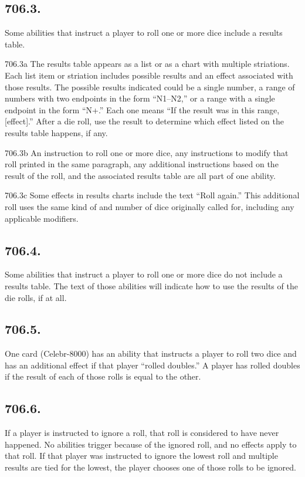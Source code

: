 \subsection*{706.3.}
Some abilities that instruct a player to roll one or more dice include a results table.

706.3a The results table appears as a list or as a chart with multiple striations. Each list item or striation includes possible results and an effect associated with those results. The possible results indicated could be a single number, a range of numbers with two endpoints in the form “N1–N2,” or a range with a single endpoint in the form “N+.” Each one means “If the result was in this range, [effect].” After a die roll, use the result to determine which effect listed on the results table happens, if any.

706.3b An instruction to roll one or more dice, any instructions to modify that roll printed in the same paragraph, any additional instructions based on the result of the roll, and the associated results table are all part of one ability.

706.3c Some effects in results charts include the text “Roll again.” This additional roll uses the same kind of and number of dice originally called for, including any applicable modifiers.

\subsection*{706.4.}
Some abilities that instruct a player to roll one or more dice do not include a results table. The text of those abilities will indicate how to use the results of the die rolls, if at all.

\subsection*{706.5.}
One card (Celebr-8000) has an ability that instructs a player to roll two dice and has an additional effect if that player “rolled doubles.” A player has rolled doubles if the result of each of those rolls is equal to the other.

\subsection*{706.6.}
If a player is instructed to ignore a roll, that roll is considered to have never happened. No abilities trigger because of the ignored roll, and no effects apply to that roll. If that player was instructed to ignore the lowest roll and multiple results are tied for the lowest, the player chooses one of those rolls to be ignored.

